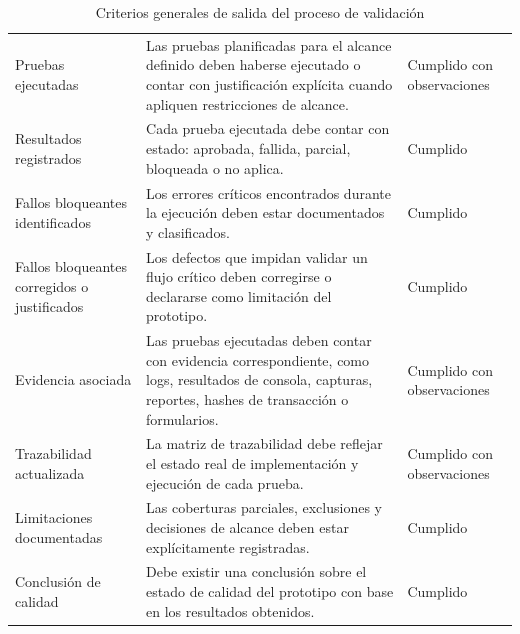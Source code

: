 \documentclass[12pt,letterpaper]{article}
\begin{document}
\begin{table}[H]
\centering
\begingroup
\scriptsize
\setlength{\tabcolsep}{3pt}
\renewcommand{\arraystretch}{1.22}

\begin{tabularx}{\textwidth}{|
>{\raggedright\arraybackslash}p{3.5cm}|
>{\raggedright\arraybackslash}X|
>{\centering\arraybackslash}p{2.2cm}|}
\hline
\multicolumn{1}{|>{\centering\arraybackslash}m{3.5cm}|}{\textbf{Criterio}} &
\multicolumn{1}{>{\centering\arraybackslash}m{8.5cm}|}{\textbf{Descripción}} &
\multicolumn{1}{>{\centering\arraybackslash}m{2.2cm}|}{\textbf{Estado}} \\
\hline

Pruebas ejecutadas &
Las pruebas planificadas para el alcance definido deben haberse ejecutado o contar con justificación explícita cuando apliquen restricciones de alcance. &
Cumplido con observaciones \\
\hline

Resultados registrados &
Cada prueba ejecutada debe contar con estado: aprobada, fallida, parcial, bloqueada o no aplica. &
Cumplido \\
\hline

Fallos bloqueantes identificados &
Los errores críticos encontrados durante la ejecución deben estar documentados y clasificados. &
Cumplido \\
\hline

Fallos bloqueantes corregidos o justificados &
Los defectos que impidan validar un flujo crítico deben corregirse o declararse como limitación del prototipo. &
Cumplido \\
\hline

Evidencia asociada &
Las pruebas ejecutadas deben contar con evidencia correspondiente, como logs, resultados de consola, capturas, reportes, hashes de transacción o formularios. &
Cumplido con observaciones \\
\hline

Trazabilidad actualizada &
La matriz de trazabilidad debe reflejar el estado real de implementación y ejecución de cada prueba. &
Cumplido con observaciones \\
\hline

Limitaciones documentadas &
Las coberturas parciales, exclusiones y decisiones de alcance deben estar explícitamente registradas. &
Cumplido \\
\hline

Conclusión de calidad &
Debe existir una conclusión sobre el estado de calidad del prototipo con base en los resultados obtenidos. &
Cumplido \\
\hline

\end{tabularx}

\endgroup
\caption{Criterios generales de salida del proceso de validación}
\label{tab:criterios-generales-salida}
\end{table}
\end{document}
